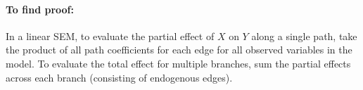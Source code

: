 \documentclass[11pt]{article}
\numberwithin{equation}{section}
\begin{document}
\paragraph{To find proof:} In a linear SEM, to evaluate the partial effect of $X$ on $Y$ along a single path, take the product of all path coefficients for each edge for all observed variables in the model. To evaluate the total effect for multiple branches, sum the partial effects across each branch (consisting of endogenous edges). 


\newpage
 
\end{document}
